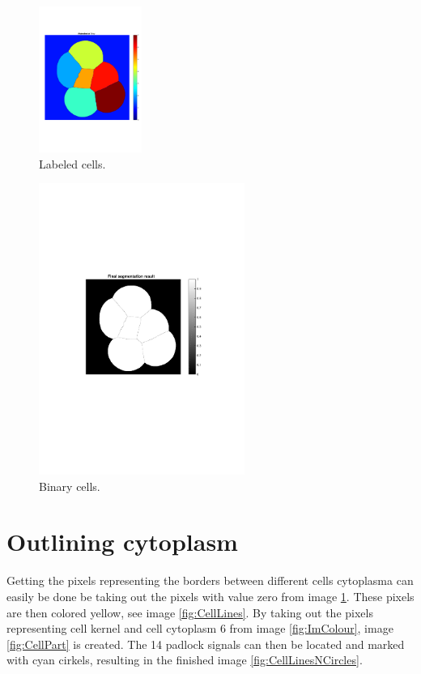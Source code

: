 \documentclass[10pt,twocolumn]{article}
\begin{document}
\begin{figure}[ht]
\centering
\includegraphics[width=0.3\textwidth]{Bilder/CellBwLabeld.pdf}
\caption{Labeled cells.}
\label{fig:CellLabeled}
\end{figure}

\begin{figure}[ht]
\centering
\includegraphics[width=0.6\textwidth]{Bilder/CellBw.pdf}
\caption{Binary cells.}
\label{fig:CellBw}
\end{figure}

\section{Outlining cytoplasm}
Getting the pixels representing the borders between different cells cytoplasma can
easily be done be taking out the pixels with value zero from image \ref{fig:CellLabeled}.
These pixels are then colored yellow, see image \ref{fig:CellLines}.
By taking out the pixels representing cell kernel and cell cytoplasm 6 from image
\ref{fig:ImColour}, image \ref{fig:CellPart} is created. The 14 padlock signals can then be located and marked with cyan cirkels, resulting in the finished image \ref{fig:CellLinesNCircles}.
\end{document}
